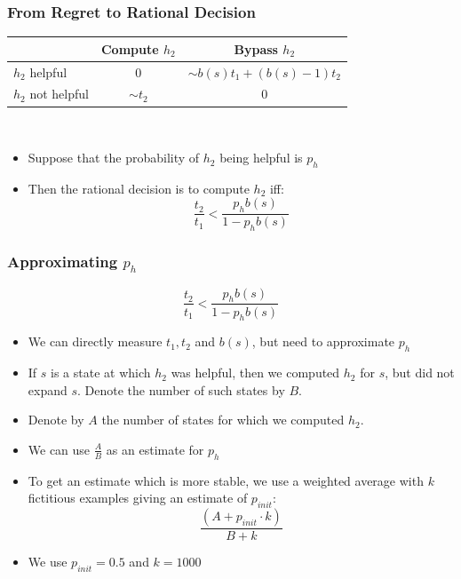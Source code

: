 \documentclass{beamer}
\begin{document}
\begin{frame}
\frametitle{From Regret to Rational Decision}
\begin{center}
\begin{tabular}{|l|c|c|}
\hline
               & Compute $h_2$ & Bypass $h_2$\\
\hline
$h_2$ helpful &   0            & $\sim b(s) t_1 + (b(s) - 1)t_2$\\
\hline
$h_2$ not helpful & $\sim t_2$      & 0 \\
\hline
\end{tabular}\\
\end{center}

\begin{itemize}
  \item Suppose that the probability of $h_2$ being helpful is $p_h$
  \item Then the rational decision is to compute $h_2$ iff:
  $$\frac{t_2}{t_1} < \frac {p_h b(s)} {1-p_h b(s)}$$  
\end{itemize}

\end{frame}


\begin{frame}
\frametitle{Approximating $p_h$}

$$\frac{t_2}{t_1} < \frac {p_h b(s)} {1-p_h b(s)}$$

\begin{itemize}
  \item We can directly measure $t_1, t_2$ and $b(s)$, but need to approximate $p_h$
  \item If $s$ is a state at which $h_2$ was helpful, then we computed
  $h_2$ for $s$, but did not expand $s$. Denote the number of such states by
  $B$.
  \item Denote by $A$ the number of states for which we computed $h_2$.
  \item We can use $\frac{A}{B}$ as an estimate for $p_h$
  \item To get an estimate which is more stable, we use a weighted average with
  $k$ fictitious examples giving an estimate of $p_{init}$: 
  $$\frac{(A + p_{init} \cdot k)}{B + k}$$
  \item We use $p_{init} = 0.5$ and $k = 1000$
\end{itemize}

\end{frame}
\end{document}
